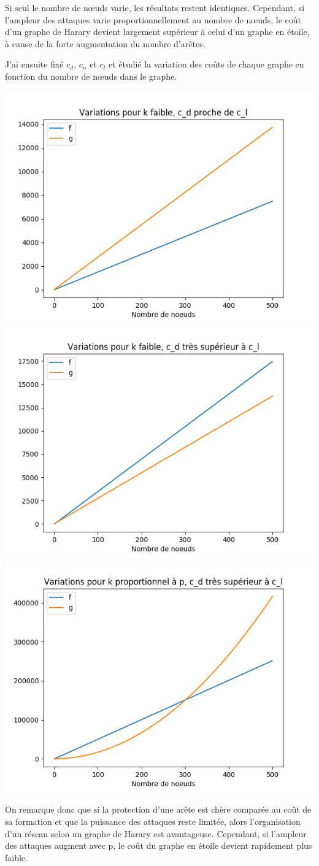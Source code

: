 \documentclass[12pt,a4paper]{article}
\begin{document}
Si seul le nombre de nœuds varie, les résultats restent identiques. Cependant, si l'ampleur des attaques varie proportionnellement au nombre de nœuds, le coût d'un graphe de Harary devient largement supérieur à celui d'un graphe en étoile, à cause de la forte augmentation du nombre d'arêtes.

J'ai ensuite fixé $c_{d}$, $c_{n}$ et $c_{l}$ et étudié la variation des coûts de chaque graphe en fonction du nombre de nœuds dans le graphe.

\begin{center}
\includegraphics[width=0.49\linewidth]{comp6.png}
\includegraphics[width=0.49\linewidth]{comp5.png}
\includegraphics[width=0.49\linewidth]{comp8.png}
\end{center}

On remarque donc que si la protection d'une arête est chère comparée au coût de sa formation et que la puissance des attaques reste limitée, alors l'organisation d'un réseau selon un graphe de Harary est   avantageuse. Cependant, si l'ampleur des attaques augment avec p, le coût du graphe en étoile devient rapidement plus faible.
\end{document}
